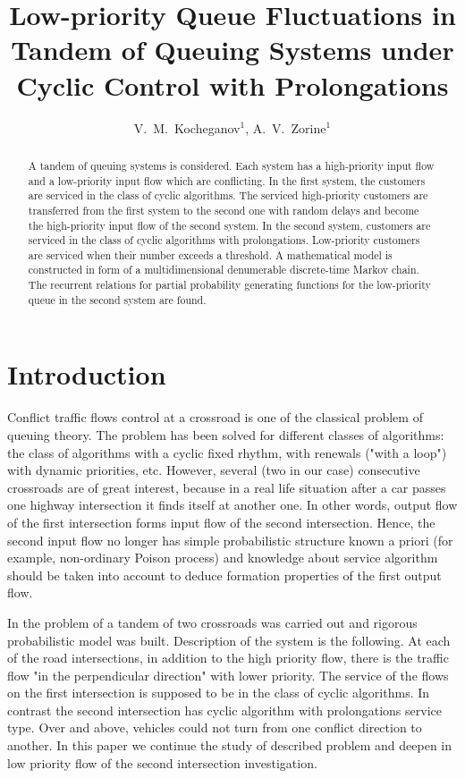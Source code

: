 \documentclass[10pt]{article}
\title{Low-priority Queue Fluctuations in Tandem of Queuing Systems under Cyclic Control with Prolongations}
\author{V.~M.~Kocheganov$^1$, A.~V.~Zorine$^1$}
\begin{document}
\maketitle

\begin{abstract}
A tandem of queuing systems is considered. Each system has a high-priority input flow and a low-priority input flow which are conflicting. In the first system, the customers are serviced in the class of cyclic algorithms. The serviced high-priority customers are transferred from the first system to the second one  with random delays and become the high-priority input flow of the second system. In the second system, customers are serviced in the class of cyclic algorithms with prolongations. Low-priority customers are serviced when their number exceeds a threshold. A mathematical model is constructed in form of a multidimensional denumerable discrete-time Markov chain. The recurrent relations for partial probability generating functions for the low-priority queue in the second system are found.

\end{abstract}


\section{Introduction}
Conflict traffic flows control at a crossroad is one of the classical problem of queuing theory. The problem has been solved for different classes of algorithms: the class of algorithms with a cyclic fixed rhythm, with renewals ("with a loop") with dynamic priorities, etc. However, several (two in our case) consecutive crossroads are of great interest, because in a real life situation after a car passes one highway intersection it finds itself at another one. In other words, output flow of the first intersection forms input flow of the second intersection. Hence, the second input flow no longer has simple probabilistic structure known a priori (for example, non-ordinary Poison process) and knowledge about service algorithm should be taken into account to deduce formation properties of the first output flow.

In \cite{k:z:02:2015} the problem of a tandem of two crossroads was carried out and rigorous probabilistic model was built. Description of the system is the following. At each of the road intersections, in addition to the high priority flow, there is the traffic flow "in the perpendicular direction" with lower priority. The service of the flows on the first intersection is supposed to be in the class of cyclic algorithms. In contrast the second intersection has cyclic algorithm with prolongations service type. Over and above, vehicles could not turn from one conflict direction to another. In this paper we continue the study of described problem and deepen in low priority flow of the second intersection investigation.
\end{document}

